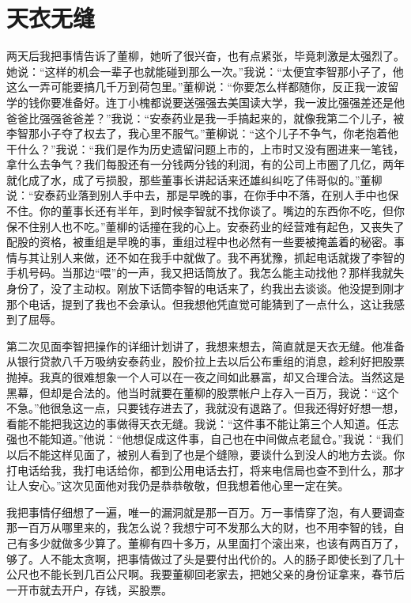 \documentclass[12pt,oneside]{book}
\begin{document}
\chapter{天衣无缝}

两天后我把事情告诉了董柳，她听了很兴奋，也有点紧张，毕竟刺激是太强烈了。她说：``这样的机会一辈子也就能碰到那么一次。''我说：``太便宜李智那小子了，他这么一弄可能要搞几千万到荷包里。''董柳说：``你要怎么样都随你，反正我一波留学的钱你要准备好。连丁小槐都说要送强强去美国读大学，我一波比强强差还是他爸爸比强强爸爸差？''我说：``安泰药业是我一手搞起来的，就像我第二个儿子，被李智那小子夺了权去了，我心里不服气。''董柳说：``这个儿子不争气，你老抱着他干什么？''我说：``我们是作为历史遗留问题上市的，上市时又没有圈进来一笔钱，拿什么去争气？我们每股还有一分钱两分钱的利润，有的公司上市圈了几亿，两年就化成了水，成了亏损股，那些董事长讲起话来还雄纠纠吃了伟哥似的。''董柳说：``安泰药业落到别人手中去，那是早晚的事，在你手中不落，在别人手中也保不住。你的董事长还有半年，到时候李智就不找你谈了。嘴边的东西你不吃，但你保不住别人也不吃。''董柳的话撞在我的心上。安泰药业的经营难有起色，又丧失了配股的资格，被重组是早晚的事，重组过程中也必然有一些要被掩盖着的秘密。事情与其让别人来做，还不如在我手中就做了。我不再犹豫，抓起电话就拨了李智的手机号码。当那边``喂''的一声，我又把话筒放了。我怎么能主动找他？那样我就失身份了，没了主动权。刚放下话筒李智的电话来了，约我出去谈谈。他没提到刚才那个电话，提到了我也不会承认。但我想他凭直觉可能猜到了一点什么，这让我感到了屈辱。

第二次见面李智把操作的详细计划讲了，我想来想去，简直就是天衣无缝。他准备从银行贷款八千万吸纳安泰药业，股价拉上去以后公布重组的消息，趁利好把股票抛掉。我真的很难想象一个人可以在一夜之间如此暴富，却又合理合法。当然这是黑幕，但却是合法的。他当时就要在董柳的股票帐户上存入一百万，我说：``这个不急。''他很急这一点，只要钱存进去了，我就没有退路了。但我还得好好想一想，看能不能把我这边的事做得天衣无缝。我说：``这件事不能让第三个人知道。任志强也不能知道。''他说：``他想促成这件事，自己也在中间做点老鼠仓。''我说：``我们以后不能这样见面了，被别人看到了也是个缝隙，要谈什么到没人的地方去谈。你打电话给我，我打电话给你，都到公用电话去打，将来电信局也查不到什么，那才让人安心。''这次见面他对我仍是恭恭敬敬，但我想着他心里一定在笑。

我把事情仔细想了一遍，唯一的漏洞就是那一百万。万一事情穿了泡，有人要调查那一百万从哪里来的，我怎么说？我想宁可不发那么大的财，也不用李智的钱，自己有多少就做多少算了。董柳有四十多万，从里面打个滚出来，也该有两百万了，够了。人不能太贪啊，把事情做过了头是要付出代价的。人的肠子即使长到了几十公尺也不能长到几百公尺啊。我要董柳回老家去，把她父亲的身份证拿来，春节后一开市就去开户，存钱，买股票。
\end{document}
